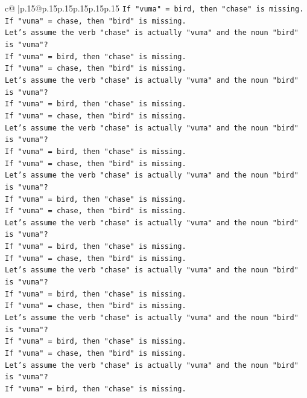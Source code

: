 \documentclass{article}
\begin{document}
{\begin{supertabular}{c@{$\;$}|p{.15\linewidth}@{}p{.15\linewidth}p{.15\linewidth}p{.15\linewidth}p{.15\linewidth}p{.15\linewidth}}
{{{\texttt{If "vuma" = bird, then "chase" is missing.} \\
\texttt{If "vuma" = chase, then "bird" is missing.} \\
\texttt{Let's assume the verb "chase" is actually "vuma" and the noun "bird" is "vuma"?} \\
\texttt{If "vuma" = bird, then "chase" is missing.} \\
\texttt{If "vuma" = chase, then "bird" is missing.} \\
\texttt{Let's assume the verb "chase" is actually "vuma" and the noun "bird" is "vuma"?} \\
\texttt{If "vuma" = bird, then "chase" is missing.} \\
\texttt{If "vuma" = chase, then "bird" is missing.} \\
\texttt{Let's assume the verb "chase" is actually "vuma" and the noun "bird" is "vuma"?} \\
\texttt{If "vuma" = bird, then "chase" is missing.} \\
\texttt{If "vuma" = chase, then "bird" is missing.} \\
\texttt{Let's assume the verb "chase" is actually "vuma" and the noun "bird" is "vuma"?} \\
\texttt{If "vuma" = bird, then "chase" is missing.} \\
\texttt{If "vuma" = chase, then "bird" is missing.} \\
\texttt{Let's assume the verb "chase" is actually "vuma" and the noun "bird" is "vuma"?} \\
\texttt{If "vuma" = bird, then "chase" is missing.} \\
\texttt{If "vuma" = chase, then "bird" is missing.} \\
\texttt{Let's assume the verb "chase" is actually "vuma" and the noun "bird" is "vuma"?} \\
\texttt{If "vuma" = bird, then "chase" is missing.} \\
\texttt{If "vuma" = chase, then "bird" is missing.} \\
\texttt{Let's assume the verb "chase" is actually "vuma" and the noun "bird" is "vuma"?} \\
\texttt{If "vuma" = bird, then "chase" is missing.} \\
\texttt{If "vuma" = chase, then "bird" is missing.} \\
\texttt{Let's assume the verb "chase" is actually "vuma" and the noun "bird" is "vuma"?} \\
\texttt{If "vuma" = bird, then "chase" is missing.} \\
}}}
\end{supertabular}}
\end{document}
